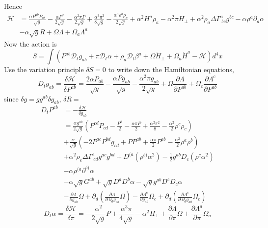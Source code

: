 \documentclass{article}
\begin{document}
Hence
\begin{align*}
\mathscr{H} & = \frac{\alpha P^{ab}P_{ab}}{\sqrt{g}} - \frac{\alpha P^{2}}{2\sqrt{g}} - \frac{\alpha^{2}\pi P}{2\sqrt{g}} + \frac{\alpha^{3}\pi^{2}}{8\sqrt{g}} - \frac{\alpha^{3}\rho^{a}\rho_{a}}{2\sqrt{g}} + \alpha^{2}H^{a}\rho_{a} - \alpha^{2}\pi H_{\perp} + \alpha^{2}\rho_{a}\Delta \Gamma^{a}_{~bc}g^{bc} - \alpha \rho^{a}\partial_{a}\alpha\\
&  - \alpha \sqrt{g}R + \Omega\Lambda + \Omega_{a}\Lambda^{a}
\end{align*}
Now the action is
\[
S = \int \left( P^{ab}\mathscr{D}_{t}g_{ab} + \pi \mathscr{D}_{t}\alpha + \rho_{a}\mathscr{D}_{t}\beta^{a} + \Omega{\dot H}_{\perp} + \Omega_{a}{\dot H}^{a} - \mathscr{H}\right) d^{4} x
\]
Use the variation principle $\delta S = 0$ to write down the Hamiltonian equations,
\[
D_{t}g_{ab} = \frac{\delta \mathscr{H}}{\delta P^{ab}} = \frac{2\alpha P_{ab}}{\sqrt{g}} - \frac{\alpha P g_{ab}}{\sqrt{g}} - \frac{\alpha^{2} \pi g_{ab}}{2 \sqrt{g}} + \Omega\frac{\partial \Lambda}{\partial P^{ab}} + \Omega_{c}\frac{\partial \Lambda^{c}}{\partial P^{ab}}
\]
since $\delta g = g g^{ab}\delta g_{ab}$, $\delta R = $
\begin{align*}
D_{t} P^{ab} & = - \frac{\delta \mathscr{H}}{\delta g_{ab}}\\
&  = \frac{\alpha g^{ab}}{2\sqrt{g}}\left(P^{cd}P_{cd} - \frac{P^{2}}{2} - \frac{\alpha \pi P}{2} + \frac{\alpha^{2}\pi^{2}}{8} - \frac{\alpha^{2}}{2}\rho^{c}\rho_{c}\right)\\
& + \frac{\alpha}{\sqrt{g}}\left(-2P^{ac}P^{bd}g_{cd} + PP^{ab} + \frac{\alpha \pi}{2}P^{ab} - \frac{\alpha^{2}}{2}\rho^{a}\rho^{b}\right)\\
& + \alpha^{2}\rho_{e}\Delta \Gamma^{e}_{~cd}g^{ac}g^{bd} + D^{(a}\left(\rho^{b)}\alpha^{2}\right) - \frac{1}{2}g^{ab}D_{c}\left(\rho^{c}\alpha^{2}\right)\\
& - \alpha \rho^{(a}\partial^{b)}\alpha\\
& - \alpha \sqrt{g}G^{ab} + \sqrt{g}D^{a}D^{b}\alpha - \sqrt{g}g^{ab}D^{c}D_{c}\alpha\\
& - \frac{\partial \Lambda}{\partial g_{ab}}\Omega + \partial_{d}\left(\frac{\partial \Lambda}{\partial~\partial_{d}g_{ab}}\Omega\right) - \frac{\partial \Lambda^{c}}{\partial g_{ab}}\Omega_{c} + \partial_{d}\left(\frac{\partial \Lambda^{c}}{\partial~\partial_{d}g_{ab}}\Omega_{c}\right)
\end{align*}
\[
D_{t}\alpha = \frac{\delta \mathscr{H}}{\delta \pi} = - \frac{\alpha^{2}}{2\sqrt{g}}P + \frac{\alpha^{3}\pi}{4\sqrt{g}} - \alpha^{2}H_{\perp} + \frac{\partial \Lambda}{\partial \pi}\Omega + \frac{\partial \Lambda^{a}}{\partial \pi}\Omega_{a}
\]
\end{document}
